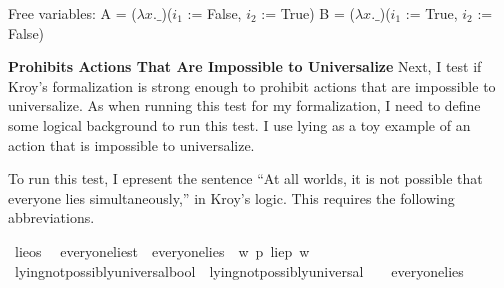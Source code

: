 \begin{isabellebody}
{  Free variables:
    A = ($\lambda x. \_$)($i_1$ := False, $i_2$ := True)
    B = ($\lambda x. \_$)($i_1$ := True, $i_2$ := False) \color{black}%
}%
\endisatagproof
{\isafoldproof}%
%
\isadelimproof
%
\endisadelimproof
%
\begin{isamarkuptext}%
\noindent \textbf{Prohibits Actions That Are Impossible to Universalize} Next, I test if Kroy's
formalization is strong enough to prohibit actions that are impossible to universalize. As when running
this test for my formalization, I need to define some logical background to run this test. I 
use lying as a toy example of an action that is impossible to universalize.  

To run this test, I epresent the sentence ``At all worlds, it is 
not possible that everyone lies simultaneously,'' in Kroy's logic. This requires the following abbreviations.%
\end{isamarkuptext}\isamarkuptrue%
\isamarkupfalse%
\ lie{\isacharcolon}{\isacharcolon}os\ \isanewline
%
\isanewline
\isanewline
{}\isamarkupfalse%
\ everyone{\isacharunderscore}lies{\isacharcolon}{\isacharcolon}t\ \ {\isachardoublequoteopen}everyone{\isacharunderscore}lies\ {\isasymequiv}\ {\isasymlambda}w{\isachardot}\ {\isacharparenleft}{\isasymforall}p{\isachardot}\ {\isacharparenleft}lie{\isacharparenleft}p{\isacharparenright}\ w{\isacharparenright}{\isacharparenright}{\isachardoublequoteclose}\isanewline
%
\isanewline
%
\isanewline
\isanewline
{}\isamarkupfalse%
\ lying{\isacharunderscore}not{\isacharunderscore}possibly{\isacharunderscore}universal{\isacharcolon}{\isacharcolon}bool\ \ {\isachardoublequoteopen}lying{\isacharunderscore}not{\isacharunderscore}possibly{\isacharunderscore}universal\ {\isasymequiv}\ {\isasymTurnstile}{\isacharparenleft}\isactrlbold {\isasymnot}\ {\isacharparenleft}{\isasymdiamond}\ everyone{\isacharunderscore}lies{\isacharparenright}{\isacharparenright}{\isachardoublequoteclose}\isanewline
%
\end{isabellebody}
